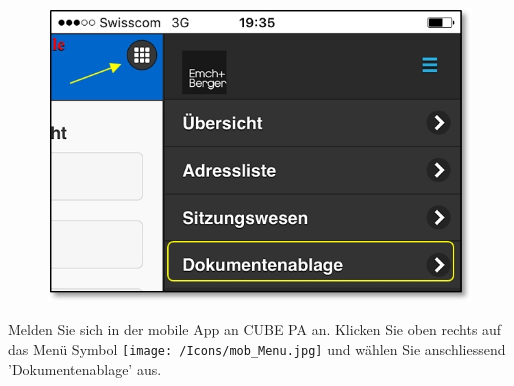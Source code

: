 \begin{figure}   %
  \vspace{-35pt}      %
  \begin{center}
    \includegraphics[width=1\linewidth]{../chapters/11_Dokumentenablage/pictures/11-mob01_Dokumentenablage_oeffnen.jpg}
  \end{center}
  \vspace{-20pt}
  \vspace{-10pt}
\end{figure}

Melden Sie sich in der mobile App an CUBE PA an. Klicken Sie oben rechts auf das Menü Symbol \texttt{[image: /Icons/mob\_Menu.jpg]} und wählen Sie anschliessend 'Dokumentenablage' aus.

\vspace{2cm}

